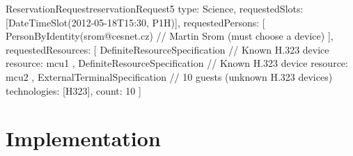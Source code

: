\begin{enumerate}
\begin{EntityExample}{ReservationRequest}{reservationRequest5}{}
type: Science,
requestedSlots: [DateTimeSlot(2012-05-18T15:30, P1H)],
requestedPersons: [
  PersonByIdentity(srom@cesnet.cz) // Martin Srom (must choose a device)
],
requestedResources: [
  DefiniteResourceSpecification { // Known H.323 device
    resource: mcu1
  },
  DefiniteResourceSpecification { // Known H.323 device
    resource: mcu2
  },
  ExternalTerminalSpecification { // 10 guests (unknown H.323 devices)
    technologies: [H323],
    count: 10
  }
]
\end{EntityExample}

\end{enumerate}


\section{Implementation}

